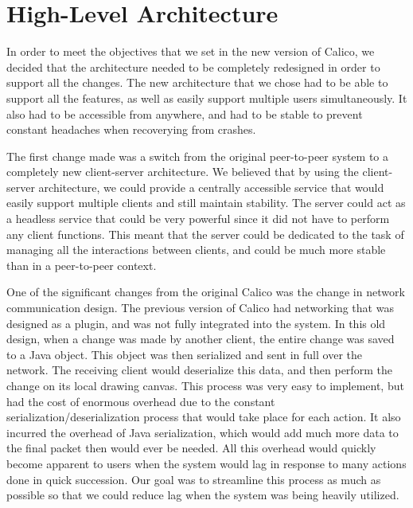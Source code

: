 \chapter{High-Level Architecture}


In order to meet the objectives that we set in the new version of Calico, we decided that the architecture needed to be completely redesigned in order to support all the changes. The new architecture that we chose had to be able to support all the features, as well as easily support multiple users simultaneously. It also had to be accessible from anywhere, and had to be stable to prevent constant headaches when recoverying from crashes.


The first change made was a switch from the original peer-to-peer system to a completely new client-server architecture. We believed that by using the client-server architecture, we could provide a centrally accessible service that would easily support multiple clients and still maintain stability. The server could act as a headless service that could be very powerful since it did not have to perform any client functions. This meant that the server could be dedicated to the task of managing all the interactions between clients, and could be much more stable than in a peer-to-peer context.

One of the significant changes from the original Calico was the change in network communication design. The previous version of Calico had networking that was designed as a plugin, and was not fully integrated into the system. In this old design, when a change was made by another client, the entire change was saved to a Java object. This object was then serialized and sent in full over the network. The receiving client would deserialize this data, and then perform the change on its local drawing canvas. This process was very easy to implement, but had the cost of enormous overhead due to the constant serialization/deserialization process that would take place for each action. It also incurred the overhead of Java serialization, which would add much more data to the final packet then would ever be needed. All this overhead would quickly become apparent to users when the system would lag in response to many actions done in quick succession. Our goal was to streamline this process as much as possible so that we could reduce lag when the system was being heavily utilized.

